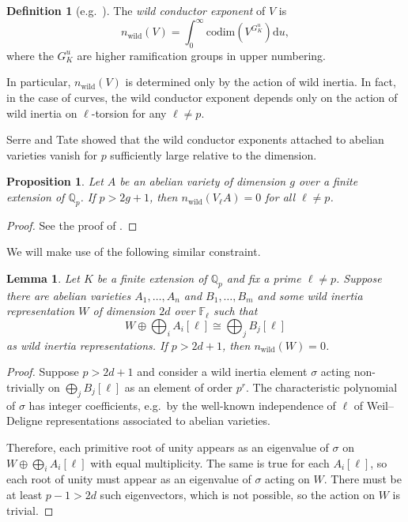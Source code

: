 \documentclass[12pt]{amsart}
\newtheorem{lemma}[theorem]{Lemma}
\newtheorem{proposition}[theorem]{Proposition}
\theoremstyle{definition}
\newtheorem{definition}[theorem]{Definition}
\theoremstyle{remark}
\newcommand{\QQ}{\mathbb{Q}}
\newcommand{\FF}{\mathbb{F}}
\DeclareMathOperator{\wild}{wild}
\begin{document}
\begin{definition}[{e.g.\ \cite[pages 3--4]{UlmerConductors}}]
    The \textit{wild conductor exponent} of $V$ is
    \[n_{\wild}(V)=\int_0^\infty \text{codim}(V^{G_K^u})\text{d}u,\]
    where the $G_K^u$ are higher ramification groups in upper numbering.
\end{definition}

In particular, $n_{\wild}(V)$ is determined only by the action of wild inertia. In fact, in the case of curves, the wild conductor exponent depends only on the action of wild inertia on $\ell$-torsion for any $\ell\ne p$.

Serre and Tate showed that the wild conductor exponents attached to abelian varieties vanish for $p$ sufficiently large relative to the dimension.

\begin{proposition}
    Let $A$ be an abelian variety of dimension $g$ over a finite extension of $\QQ_p$. If $p>2g+1$, then $n_{\wild}(V_\ell A)=0$ for all $\ell\ne p$.
\end{proposition}

\begin{proof}
    See the proof of \cite[Corollary 2]{SerreTate68}.
\end{proof}

We will make use of the following similar constraint.

\begin{lemma}\label{lem:0wild}
    Let $K$ be a finite extension of $\QQ_p$ and fix a prime $\ell\ne p$. Suppose there are abelian varieties $A_1,\hdots,A_n$ and $B_1,\hdots,B_m$ and some wild inertia representation $W$ of dimension $2d$ over $\FF_\ell$ such that
    \[W\oplus\bigoplus_i A_i[\ell]\cong \bigoplus_j B_j[\ell]\]
    as wild inertia representations. If $p>2d+1$, then $n_{\wild}(W)=0$.
\end{lemma}

\begin{proof}
    Suppose $p>2d+1$ and consider a wild inertia element $\sigma$ acting non-trivially on $\bigoplus_j B_j[\ell]$ as an element of order $p^r$. The characteristic polynomial of $\sigma$ has integer coefficients, e.g.\ by the well-known independence of $\ell$ of Weil--Deligne representations associated to abelian varieties.
    
    Therefore, each primitive root of unity appears as an eigenvalue of $\sigma$ on $W\oplus\bigoplus_i A_i[\ell]$ with equal multiplicity. The same is true for each $A_i[\ell]$, so each root of unity must appear as an eigenvalue of $\sigma$ acting on $W$. There must be at least $p-1>2d$ such eigenvectors, which is not possible, so the action on $W$ is trivial.
\end{proof}
\end{document}
